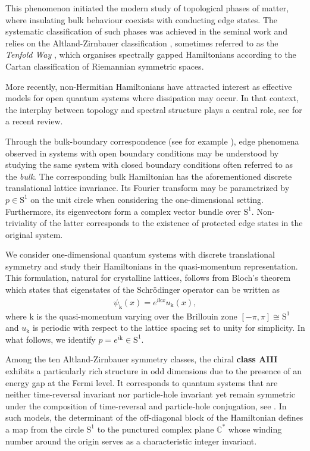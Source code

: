 \documentclass[pdflatex,sn-mathphys-num]{sn-jnl}
\theoremstyle{thmstyleone}
\numberwithin{equation}{section}
\newcommand{\Sp}{\mathrm{S}^{1}}
\newcommand{\C}{\mathbb{C}}
\begin{document}
This phenomenon initiated the modern study of topological phases of matter, where insulating bulk behaviour coexists with conducting edge states. The systematic classification of such phases was achieved in the seminal work \cite{SchnyderClassificationTopologicalInsulators2008} and relies on the Altland-Zirnbauer classification \cite{AltlandNonstandardSymmetryClasses1997}, sometimes referred to as the \textit{Tenfold Way} \cite{BaezTenfoldWay2020}, which organises spectrally gapped Hamiltonians according to the Cartan classification of Riemannian symmetric spaces.

More recently, non-Hermitian Hamiltonians have attracted interest as effective models for open quantum systems where dissipation may occur. In that context, the interplay between topology and spectral structure plays a central role, see \cite{AshidaNonHermitianPhysics2020} for a recent review.


Through the bulk-boundary correspondence (see for example \cite{GrafBulkEdgeCorrespondenceDisordered2018,SawadaBulkBoundaryCorrespondenceErgodic2024}), edge phenomena observed in systems with open boundary conditions may be understood by studying the same system with closed boundary conditions often referred to as the \textit{bulk}. The corresponding bulk Hamiltonian has the aforementioned discrete translational lattice invariance. Its Fourier transform may be parametrized by $p\in\Sp$ on the unit circle when considering the one-dimensional setting. Furthermore, its eigenvectors form a complex vector bundle over $\Sp$. Non-triviality of the latter corresponds to the existence of protected edge states in the original system.

We consider one-dimensional quantum systems with discrete translational symmetry and study their Hamiltonians in the quasi-momentum representation. This formulation, natural for crystalline lattices, follows from Bloch's theorem which states that eigenstates of the Schr\"odinger operator can be written as
\begin{align}\label{th:bloch-d1}
    \psi_{\mathrm{k}}\left(x\right)=e^{i\mathrm{k}x}u_{\mathrm{k}}\left(x\right),
\end{align}
where $\mathrm{k}$ is the quasi-momentum varying over the Brillouin zone $[-\pi,\pi]\cong\Sp$ and $u_{\mathrm{k}}$ is periodic with respect to the lattice spacing set to unity for simplicity. In what follows, we identify $p=e^{i\mathrm{k}}\in\Sp$.


Among the ten Altland-Zirnbauer symmetry classes, the chiral \textbf{class AIII} exhibits a particularly rich structure in odd dimensions due to the presence of an energy gap at the Fermi level. It corresponds to quantum systems that are neither time-reversal invariant nor particle-hole invariant yet remain symmetric under the composition of time-reversal and particle-hole conjugation, see \cite[Section~E]{ChiuClassificationTopologicalQuantum2016}. In such models, the determinant of the off-diagonal block of the Hamiltonian defines a map from the circle $\Sp$ to the punctured complex plane $\C^{*}$ whose winding number around the origin serves as a characteristic integer invariant. 
\end{document}
